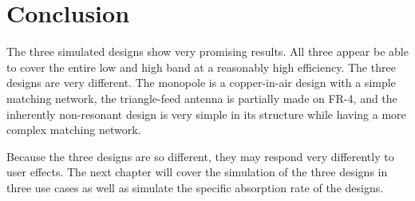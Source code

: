 \section{Conclusion}
The three simulated designs show very promising results. All three appear be able to cover the entire low and high band at a reasonably high efficiency. The three designs are very different. The monopole is a copper-in-air design with a simple matching network, the triangle-feed antenna is partially made on FR-4, and the inherently non-resonant design is very simple in its structure while having a more complex matching network.

Because the three designs are so different, they may respond very differently to user effects. The next chapter will cover the simulation of the three designs in three use cases as well as simulate the specific absorption rate of the designs.
